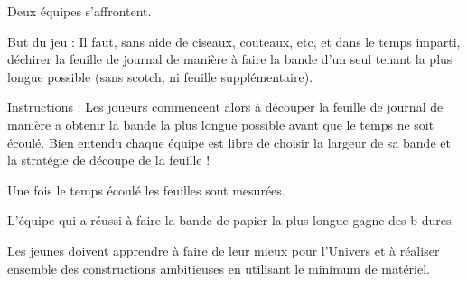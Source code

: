\documentclass{grand-jeu}
\begin{document}
\begin{liste-materiel}
\end{liste-materiel}

\begin{regles}
Deux équipes s’affrontent.

But du jeu : Il faut, sans aide de ciseaux, couteaux, etc, et dans le temps imparti, déchirer la feuille de journal de manière à faire la bande d’un seul tenant la plus longue possible (sans scotch, ni feuille supplémentaire).

Instructions : Les joueurs commencent alors à découper la feuille de journal de manière a obtenir la bande la plus longue possible avant que le temps ne soit écoulé. Bien entendu chaque équipe est libre de choisir la largeur de sa bande et la stratégie de découpe de la feuille !

Une fois le temps écoulé les feuilles sont mesurées. 

L'équipe qui a réussi à faire la bande de papier la plus longue gagne des b-dures.
\end{regles}

\begin{imaginaire}
Les jeunes doivent apprendre à faire de leur mieux pour l'Univers et à réaliser ensemble des constructions ambitieuses en utilisant le minimum de matériel.
\end{imaginaire}

\begin{moments-stop}
\end{moments-stop}
\end{document}
